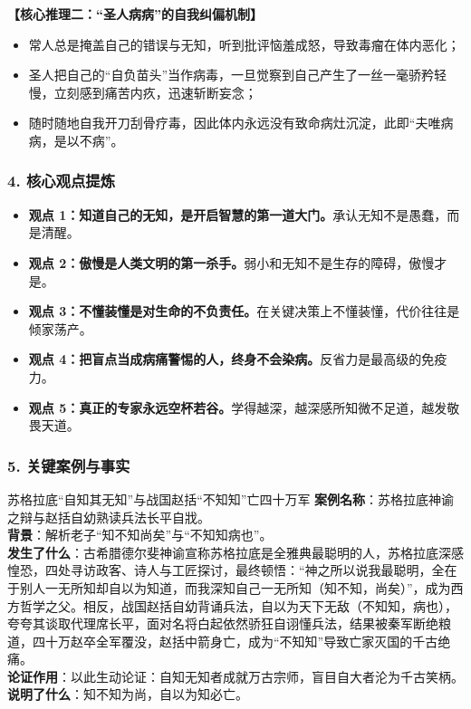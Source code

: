 \noindent\textbf{【核心推理二：“圣人病病”的自我纠偏机制】}
\begin{itemize}
    \item 常人总是掩盖自己的错误与无知，听到批评恼羞成怒，导致毒瘤在体内恶化；
    \item 圣人把自己的“自负苗头”当作病毒，一旦觉察到自己产生了一丝一毫骄矜轻慢，立刻感到痛苦内疚，迅速斩断妄念；
    \item 随时随地自我开刀刮骨疗毒，因此体内永远没有致命病灶沉淀，此即“夫唯病病，是以不病”。
\end{itemize}

\subsubsection{4. 核心观点提炼}
\begin{itemize}
    \item \textbf{观点 1：知道自己的无知，是开启智慧的第一道大门。}承认无知不是愚蠢，而是清醒。
    \item \textbf{观点 2：傲慢是人类文明的第一杀手。}弱小和无知不是生存的障碍，傲慢才是。
    \item \textbf{观点 3：不懂装懂是对生命的不负责任。}在关键决策上不懂装懂，代价往往是倾家荡产。
    \item \textbf{观点 4：把盲点当成病痛警惕的人，终身不会染病。}反省力是最高级的免疫力。
    \item \textbf{观点 5：真正的专家永远空杯若谷。}学得越深，越深感所知微不足道，越发敬畏天道。
\end{itemize}

\subsubsection{5. 关键案例与事实}
\begin{CaseBox}{苏格拉底“自知其无知”与战国赵括“不知知”亡四十万军}
\textbf{案例名称}：苏格拉底神谕之辩与赵括自幼熟读兵法长平自戕。\\
\textbf{背景}：解析老子“知不知尚矣”与“不知知病也”。\\
\textbf{发生了什么}：古希腊德尔斐神谕宣称苏格拉底是全雅典最聪明的人，苏格拉底深感惶恐，四处寻访政客、诗人与工匠探讨，最终顿悟：“神之所以说我最聪明，全在于别人一无所知却自以为知道，而我深知自己一无所知（知不知，尚矣）”，成为西方哲学之父。相反，战国赵括自幼背诵兵法，自以为天下无敌（不知知，病也），夸夸其谈取代理席长平，面对名将白起依然骄狂自诩懂兵法，结果被秦军断绝粮道，四十万赵卒全军覆没，赵括中箭身亡，成为“不知知”导致亡家灭国的千古绝痛。\\
\textbf{论证作用}：以此生动论证：自知无知者成就万古宗师，盲目自大者沦为千古笑柄。\\
\textbf{说明了什么}：知不知为尚，自以为知必亡。
\end{CaseBox}

